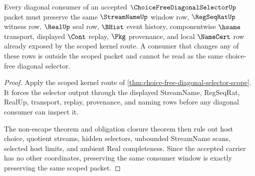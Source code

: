 \begin{theorem}
\label{thm:choice-free-diagonal-selector-scoped-window-consumer}
Every diagonal consumer of an accepted $\ChoiceFreeDiagonalSelectorUp$ packet must preserve the same $\StreamNameUp$ window row, $\RegSeqRatUp$ witness row, $\RealUp$ seal row, $\BHist$ event history, componentwise $\hsame$ transport, displayed $\Cont$ replay, $\Pkg$ provenance, and local $\NameCert$ row already exposed by the scoped kernel route. A consumer that changes any of these rows is outside the scoped packet and cannot be read as the same choice-free diagonal selector.
\end{theorem}
\begin{proof}
Apply the scoped kernel route of \autoref{thm:choice-free-diagonal-selector-scope}. It forces the selector output through the displayed StreamName, RegSeqRat, RealUp, transport, replay, provenance, and naming rows before any diagonal consumer can inspect it.

The non-escape theorem and obligation closure theorem then rule out host choice, quotient streams, hidden selectors, unbounded StreamName scans, selected host limits, and ambient Real completeness. Since the accepted carrier has no other coordinates, preserving the same consumer window is exactly preserving the same scoped packet.
\end{proof}

